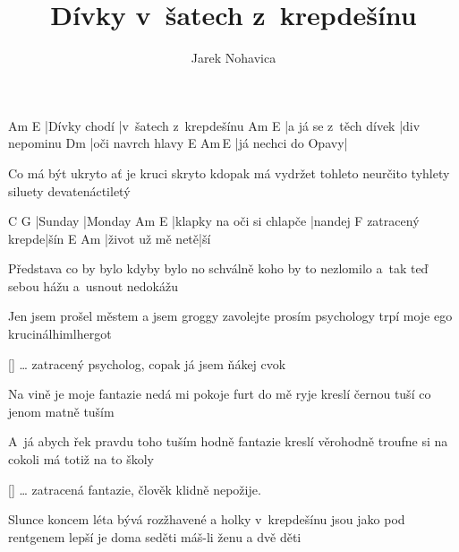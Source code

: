 \documentclass{song}
\author{Jarek Nohavica}
\title{Dívky v~šatech z~krepdešínu}
\begin{document}
\begin{multicols}{2}
\strophe
Am           E\7
|Dívky chodí |v~šatech z~krepdešínu
Am                    E\7
|a já se z~těch dívek |div nepominu
Dm
|oči navrch hlavy
E\7                Am\,E\7
|já nechci do Opavy|
\endstrophe

\columnbreak

\strophe*
Co má být ukryto ať je kruci skryto
kdopak má vydržet tohleto neurčito
tyhlety siluety
devatenáctiletý
\endstrophe
\end{multicols}

C       G
|Sunday |Monday
Am                        E\7
|klapky na oči si chlapče |nandej
                F
zatracený krepde|šín
E\7              Am
|život už mě netě|ší
\endstrophe

\begin{multicols}{2}
\strophe*
Představa co by bylo kdyby bylo
no schválně koho by to nezlomilo
a~tak teď sebou hážu
a~usnout nedokážu
\endstrophe

\strophe*
Jen jsem prošel městem a jsem groggy
zavolejte prosím psychology
trpí moje ego
krucinálhimlhergot
\endstrophe
\end{multicols}

\ref{} \ldots{} zatracený psycholog, copak já jsem ňákej cvok

\begin{multicols}{2}
\strophe*
Na vině je moje fantazie
nedá mi pokoje furt do mě ryje
kreslí černou tuší
co jenom matně tuším
\endstrophe

\strophe*
A~já abych řek pravdu toho tuším hodně
fantazie kreslí věrohodně
troufne si na cokoli
má totiž na to školy
\endstrophe
\end{multicols}

\ref{} \ldots{} zatracená fantazie, člověk klidně nepožije.

\strophe*
Slunce koncem léta bývá rozžhavené
a holky v~krepdešínu jsou jako pod rentgenem
lepší je doma seděti
máš-li ženu a dvě děti
\endstrophe
\end{document}
